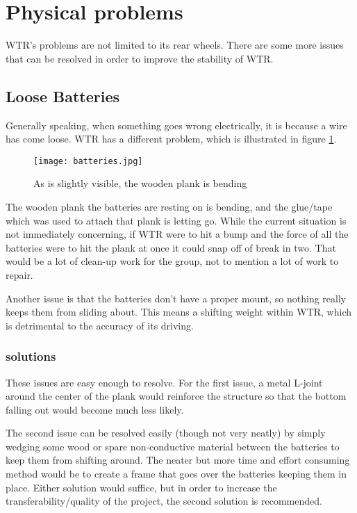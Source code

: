 \section{Physical problems}
WTR's problems are not limited to its rear wheels.
There are some more issues that can be resolved in order to improve the stability of WTR.

\subsection{Loose Batteries}
Generally speaking, when something goes wrong electrically, it is because a wire has come loose.
WTR has a different problem, which is illustrated in figure \ref{fig::batteries}.

\begin{figure}[H]
\centering
\texttt{[image: batteries.jpg]}
\caption{As is slightly visible, the wooden plank is bending}
\label{fig::batteries}
\end{figure}

The wooden plank the batteries are resting on is bending, and the glue/tape which was used to attach that plank is letting go.
While the current situation is not immediately concerning, if WTR were to hit a bump and the force of all the batteries were to hit the plank at once it could snap off of break in two.
That would be a lot of clean-up work for the group, not to mention a lot of work to repair.

Another issue is that the batteries don't have a proper mount, so nothing really keeps them from sliding about.
This means a shifting weight within WTR, which is detrimental to the accuracy of its driving.

\subsubsection{solutions}
These issues are easy enough to resolve.
For the first issue, a metal L-joint around the center of the plank would reinforce the structure so that the bottom falling out would become much less likely.

The second issue can be resolved easily (though not very neatly) by simply wedging some wood or spare non-conductive material between the batteries to keep them from shifting around.
The neater but more time and effort consuming method would be to create a frame that goes over the batteries keeping them in place.
Either solution would suffice, but in order to increase the transferability/quality of the project, the second solution is recommended.

